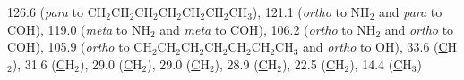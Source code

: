 {{{126.6 (\textit{para} to CH$_2$CH$_2$CH$_2$CH$_2$CH$_2$CH$_2$CH$_3$), 
121.1 (\textit{ortho} to NH$_2$ and \textit{para} to COH), 
119.0 (\textit{meta} to NH$_2$ and \textit{meta} to COH), 
106.2 (\textit{ortho} to NH$_2$ and \textit{ortho} to COH), 
105.9 (\textit{ortho} to CH$_2$CH$_2$CH$_2$\-CH$_2$\-CH$_2$\-CH$_2$CH$_3$ and  \textit{ortho} to OH), 
33.6 (\underline{C}H$_2$), 
31.6 (\underline{C}H$_2$), 
29.0 (\underline{C}H$_2$), 
29.0 (\underline{C}H$_2$), 
28.9 (\underline{C}H$_2$), 
22.5 (\underline{C}H$_2$), 
14.4 (\underline{C}H$_3$)}
\\[1\baselineskip]
}}
